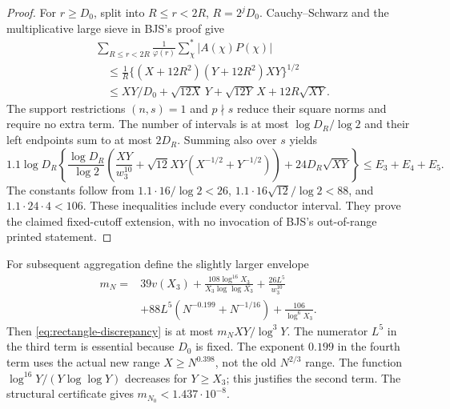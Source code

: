 \documentclass[11pt]{article}
\theoremstyle{definition}
\begin{document}
\begin{proof}
For $r\ge D_0$, split into $R\le r<2R$, $R=2^jD_0$.
Cauchy--Schwarz and the multiplicative large sieve in BJS's proof give
\begin{align*}
 &\sum_{R\le r<2R}\frac1{\varphi(r)}\sum_\chi^*|A(\chi)P(\chi)|\\
 &\quad\le\frac1R\{(X+12R^2)(Y+12R^2)XY\}^{1/2}\\
 &\quad\le XY/D_0+\sqrt{12X}\,Y+\sqrt{12Y}\,X+12R\sqrt{XY}.
\end{align*}
The support restrictions $(n,s)=1$ and $p\nmid s$ reduce their square
norms and require no extra term.  The number of intervals is at most
$\log D_R/\log2$ and their left endpoints sum to at most $2D_R$.
Summing also over $s$ yields
\[
 1.1\log D_R\left\{\frac{\log D_R}{\log2}
 \left(\frac{XY}{w_3^{10}}+\sqrt{12}XY(X^{-1/2}+Y^{-1/2})\right)
 +24D_R\sqrt{XY}\right\}\le E_3+E_4+E_5.
\]
The constants follow from $1.1\cdot16/\log2<26$,
$1.1\cdot16\sqrt{12}/\log2<88$, and $1.1\cdot24\cdot4<106$.
These inequalities include every conductor interval.  They prove the
claimed fixed-cutoff extension, with no invocation of BJS's out-of-range
printed statement.
\end{proof}

For subsequent aggregation define the slightly larger envelope
\begin{equation}\label{eq:mrect}
\begin{split}
 m_N={}&39v(X_3)+\frac{108\log^{16}X_3}{X_3\log\log X_3}
       +\frac{26L^5}{w_3^{10}}\\
 &+88L^5(N^{-0.199}+N^{-1/16})+\frac{106}{\log^6X_3}.
\end{split}
\end{equation}
Then \eqref{eq:rectangle-discrepancy} is at most $m_NXY/\log^3Y$.
The numerator $L^5$ in the third term is essential because $D_0$ is
fixed.  The exponent $0.199$ in the fourth term uses the actual new
range $X\ge N^{0.398}$, not the old $N^{2/3}$ range.  The function
$\log^{16}Y/(Y\log\log Y)$ decreases for $Y\ge X_3$; this justifies
the second term.  The structural certificate gives
$m_{N_0}<1.437\cdot10^{-8}$.
\end{document}
